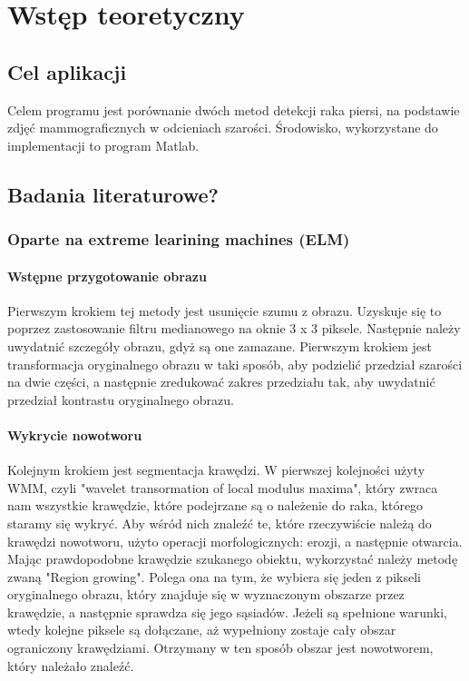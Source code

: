\documentclass[11pt,openany]{sprawozdanie-agh}
\begin{document}

\stronatytulowa{}

\tableofcontents

\clearpage

\section{Wstęp teoretyczny}
\subsection{Cel aplikacji}
Celem programu jest porównanie dwóch metod detekcji raka piersi, na podstawie zdjęć mammograficznych w odcieniach szarości. Środowisko, wykorzystane do implementacji to program Matlab.

\subsection{Badania literaturowe?}
\subsubsection{Oparte na extreme learining machines (ELM)}
\paragraph{Wstępne przygotowanie obrazu\\}
Pierwszym krokiem tej metody jest usunięcie szumu z obrazu. Uzyskuje się to poprzez zastosowanie filtru medianowego na oknie 3 x 3 piksele. 
Następnie należy uwydatnić szczegóły obrazu, gdyż są one zamazane. Pierwszym krokiem jest transformacja oryginalnego obrazu w taki sposób, aby podzielić przedział szarości na dwie części, a następnie zredukować zakres przedziału tak, aby uwydatnić przedział kontrastu oryginalnego obrazu.

\paragraph{Wykrycie nowotworu\\}
Kolejnym krokiem jest segmentacja krawędzi. W pierwszej kolejności użyty WMM, czyli "wavelet transormation of local modulus maxima", który zwraca nam wszystkie krawędzie, które podejrzane są o należenie do raka, którego staramy się wykryć. Aby wśród nich znaleźć te, które rzeczywiście należą do krawędzi nowotworu, użyto operacji morfologicznych: erozji, a następnie otwarcia. Mając prawdopodobne krawędzie szukanego obiektu, wykorzystać należy metodę zwaną "Region growing". Polega ona na tym, że wybiera się jeden z pikseli oryginalnego obrazu, który znajduje się w wyznaczonym obszarze przez krawędzie, a następnie sprawdza się jego sąsiadów. Jeżeli są spełnione warunki, wtedy kolejne piksele są dołączane, aż wypełniony zostaje cały obszar ograniczony krawędziami. Otrzymany w ten sposób obszar jest nowotworem, który należało znaleźć.
\end{document}
